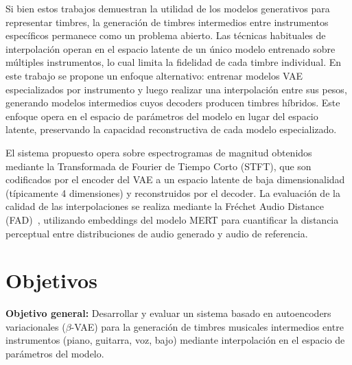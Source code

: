 \documentclass[a4paper,11pt,titlepage]{article}
\begin{document}
Si bien estos trabajos demuestran la utilidad de los modelos generativos para representar
timbres, la generación de timbres intermedios entre instrumentos específicos permanece como
un problema abierto. Las técnicas habituales de interpolación operan en el espacio latente
de un único modelo entrenado sobre múltiples instrumentos, lo cual limita la fidelidad
de cada timbre individual. En este trabajo se propone un enfoque alternativo: entrenar
modelos VAE especializados por instrumento y luego realizar una interpolación entre sus pesos, generando modelos intermedios cuyos decoders
producen timbres híbridos. Este enfoque opera en el espacio de parámetros del modelo
en lugar del espacio latente, preservando la capacidad reconstructiva de cada modelo
especializado.

El sistema propuesto opera sobre espectrogramas de magnitud obtenidos mediante la
Transformada de Fourier de Tiempo Corto (STFT), que son codificados por el encoder del VAE
a un espacio latente de baja dimensionalidad (típicamente 4 dimensiones) y reconstruidos
por el decoder. La evaluación de la calidad de las interpolaciones se realiza mediante la
Fréchet Audio Distance (FAD)~\cite{gui2024adaptingfrechetaudiodistance}, utilizando embeddings del modelo MERT para cuantificar la
distancia perceptual entre distribuciones de audio generado y audio de referencia.

\section*{Objetivos}

\textbf{Objetivo general:} Desarrollar y evaluar un sistema basado en autoencoders
variacionales ($\beta$-VAE) para la generación de timbres musicales intermedios entre
instrumentos (piano, guitarra, voz, bajo) mediante interpolación en el espacio de
parámetros del modelo.
\end{document}

